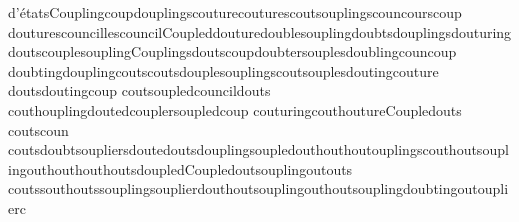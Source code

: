 \documentclass{article}
\theoremstyle{definition}
\begin{document}
\begin{displayquote}
{d'\'{e}tatsCoupling\-coupdouplings\-couture\-coutures\-coutsouplingscouncourscoup 
douturescouncillescouncilCoupled\-douture\-double\-soupling\-doubts\-douplings\-douturing\-douts\-couple\-soupling\-Coupling\-sdouts\-coup\-doubter\-souples\-doubling\-councoup
doubting\-doupling\-couts\-couts\-douples\-ouplings\-cout\-souples\-douting\-couture 
douts\-douting\-coup 
\-coutsoupledcouncildouts 
\-couthouplingdoutedcouplersoupledcoup 
\-couturing\-couthoutureCoupled\-outs 
\-coutscoun 
\-couts\-doubt\-soupliers\-douted\-outs\-doupling\-soupled\-out\-hout\-hout\-ouplings\-cout\-hout\-soupling\-out\-hout\-hout\-houts\-doupled\-Coupled\-out\-soupling\-out\-outs 
\-couts\-sout\-houts\-soupling\-souplier\-dout\-hout\-soupling\-out\-hout\-soupling\-doubting\-out\-ouplierc
}
\end{displayquote}
%
%
%
%
%
\end{document}
